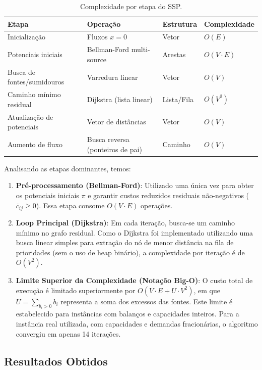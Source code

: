 \begin{table}[H]
  \centering
  \footnotesize
  \begin{tabular}{llll}
    \toprule
    \textbf{Etapa} & \textbf{Operação} & \textbf{Estrutura} & \textbf{Complexidade} \\
    \midrule
    Inicialização & Fluxos $x = 0$ & Vetor & $O(E)$ \\
    Potenciais iniciais & Bellman-Ford multi-source & Arestas & $O(V \cdot E)$ \\
    Busca de fontes/sumidouros & Varredura linear & Vetor & $O(V)$ \\
    Caminho mínimo residual & Dijkstra (lista linear) & Lista/Fila & $O(V^2)$ \\
    Atualização de potenciais & Vetor de distâncias & Vetor & $O(V)$ \\
    Aumento de fluxo & Busca reversa (ponteiros de pai) & Caminho & $O(V)$ \\
    \bottomrule
  \end{tabular}
  \caption{Complexidade por etapa do SSP.}
  \label{tab:complexidade}
\end{table}

Analisando as etapas dominantes, temos:
\begin{enumerate}
  \item \textbf{Pré-processamento (Bellman-Ford)}: Utilizado uma única vez para obter os potenciais iniciais $\pi$ e garantir custos reduzidos residuais não-negativos ($\bar{c}_{ij} \geq 0$). Essa etapa consome $O(V \cdot E)$ operações.
  \item \textbf{Loop Principal (Dijkstra)}: Em cada iteração, busca-se um caminho mínimo no grafo residual. Como o Dijkstra foi implementado utilizando uma busca linear simples para extração do nó de menor distância na fila de prioridades (sem o uso de heap binário), a complexidade por iteração é de $O(V^2)$.
  \item \textbf{Limite Superior da Complexidade (Notação Big-O)}: O custo total de execução é limitado superiormente por $O(V \cdot E + U \cdot V^2)$, em que $U = \sum_{b_i > 0} b_i$ representa a soma dos excessos das fontes. Este limite é estabelecido para instâncias com balanços e capacidades inteiros. Para a instância real utilizada, com capacidades e demandas fracionárias, o algoritmo convergiu em apenas 14 iterações.
\end{enumerate}


\subsection{Resultados Obtidos}

